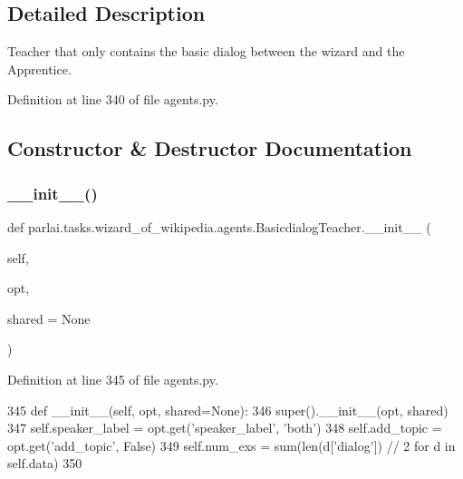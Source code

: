 \subsection{Detailed Description}
\begin{DoxyVerb}Teacher that only contains the basic dialog between the wizard and the Apprentice.
\end{DoxyVerb}
 

Definition at line 340 of file agents.\+py.



\subsection{Constructor \& Destructor Documentation}
\mbox{\label{classparlai_1_1tasks_1_1wizard__of__wikipedia_1_1agents_1_1BasicdialogTeacher_a15a3b192484500d616eeac7bcd871cc2}} 
\subsubsection{\texorpdfstring{\+\_\+\+\_\+init\+\_\+\+\_\+()}{\_\_init\_\_()}}
{\footnotesize\ttfamily def parlai.\+tasks.\+wizard\+\_\+of\+\_\+wikipedia.\+agents.\+Basicdialog\+Teacher.\+\_\+\+\_\+init\+\_\+\+\_\+ (\begin{DoxyParamCaption}\item[{}]{self,  }\item[{}]{opt,  }\item[{}]{shared = {\ttfamily None} }\end{DoxyParamCaption})}



Definition at line 345 of file agents.\+py.


\begin{DoxyCode}
345     \textcolor{keyword}{def }\_\_init\_\_(self, opt, shared=None):
346         super().\_\_init\_\_(opt, shared)
347         self.speaker\_label = opt.get(\textcolor{stringliteral}{'speaker\_label'}, \textcolor{stringliteral}{'both'})
348         self.add\_topic = opt.get(\textcolor{stringliteral}{'add\_topic'}, \textcolor{keyword}{False})
349         self.num\_exs = sum(len(d[\textcolor{stringliteral}{'dialog'}]) // 2 \textcolor{keywordflow}{for} d \textcolor{keywordflow}{in} self.data)
350 
\end{DoxyCode}


